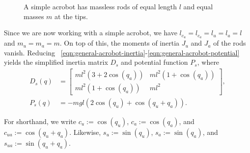\begin{figure}
    \centering
    
    \caption{A simple acrobot has massless rods of equal length \(l\) and 
    equal masses \(m\) at the tips.}
    \label{fig:simple-acrobot-model}
\end{figure}

Since we are now working with a simple acrobot, 
we have \(l_{c_u} = l_{c_a} = l_u = l_a = l\) and
\(m_u = m_a = m\). 
On top of this, the moments of inertia \(J_u\) and \(J_a\) of the rods vanish.
Reducing
~\eqref{eqn:general-acrobot-inertia}-\ref{eqn:general-acrobot-potential}
yields the simplified inertia matrix \(D_s\) and potential function \(P_s\),
where
\begin{align}
    D_s(q) &= \begin{bmatrix}
        ml^2\left(3+2\cos(q_a)\right) & 
        ml^2\left(1+\cos(q_a)\right) \\
        ml^2\left(1+\cos(q_a)\right) &
        ml^2
    \end{bmatrix} 
    , \\
    P_s(q) &= -mgl\left(2\cos(q_u)+\cos(q_u+q_a)\right)
    .
\end{align}
\begin{notation}
    For shorthand, we write \(c_u := \cos(q_u)\), \(c_a := \cos(q_a)\), and 
    \(c_{ua} := \cos(q_u + q_a)\). Likewise, \(s_u := \sin(q_u)\), 
    \(s_a := \sin(q_a)\), and \(s_{ua} := \sin(q_u + q_a)\).
\end{notation}

